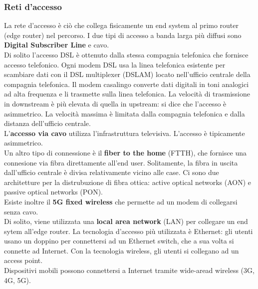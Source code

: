\documentclass[11pt]{article}
\begin{document}
\subsubsection{Reti d'accesso}
La rete d'accesso è ciò che collega fisicamente un end system al primo router (edge router) nel percorso. I due tipi di
accesso a banda larga più diffusi sono \textbf{Digital Subscriber Line} e cavo.\\
Di solito l'accesso DSL è ottenuto dalla stessa compagnia telefonica che fornisce accesso telefonico. Ogni modem DSL usa 
la linea telefonica esistente per scambiare dati con il DSL multiplexer (DSLAM) locato nell'ufficio centrale della  
compagnia telefonica. Il modem casalingo converte dati digitali in toni analogici ad alta frequenza e li trasmette sulla 
linea telefonica. La velocità di trasmissione in downstream è più elevata di quella in upstream: si dice che l'accesso è
asimmetrico. La velocità massima è limitata dalla compagnia telefonica e dalla distanza dell'ufficio centrale.\\
L'\textbf{accesso via cavo} utilizza l'infrastruttura televisiva. L'accesso è tipicamente asimmetrico.\\
Un altro tipo di connessione è il \textbf{fiber to the home} (FTTH), che fornisce una connesione via fibra direttamente
all'end user. Solitamente, la fibra in uscita dall'ufficio centrale è divisa relativamente vicino alle case. Ci sono due
architetture per la distrubuzione di fibra ottica: active optical networks (AON) e passive optical networks (PON).\\
Esiste inoltre il \textbf{5G fixed wireless} che permette ad un modem di collegarsi senza cavo.\\
Di solito, viene utilizzata una \textbf{local area network} (LAN) per collegare un end sytem all'edge router. La
tecnologia d'accesso più utilizzata è Ethernet: gli utenti usano un doppino per connettersi ad un Ethernet switch, che a
sua volta si connette ad Internet. Con la tecnologia wireless, gli utenti si collegano ad un access point.\\
Dispositivi mobili possono connettersi a Internet tramite wide-aread wireless (3G, 4G, 5G).
\end{document}
